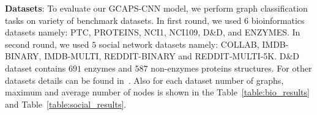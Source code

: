 \documentclass{article}
\begin{document}
\noindent \textbf{Datasets}:  To evaluate  our  GCAPS-CNN model, we perform graph classification tasks on variety of benchmark datasets. In first round, we used $6$ bioinformatics   datasets namely:   PTC, PROTEINS, NCI1, NCI109, D\&D, and ENZYMES. In second round, we used $5$   social network datasets namely: COLLAB, IMDB-BINARY, IMDB-MULTI, REDDIT-BINARY and  REDDIT-MULTI-5K. D\&D dataset contains $691$ enzymes and $587$ non-enzymes proteins structures.  For other datasets  details can be found in~\cite{yanardag2015deep}. Also for each dataset number  of graphs, maximum   and average number of nodes   is  shown in the Table~\ref{table:bio_results} and Table~\ref{table:social_results}. 


\end{document}
